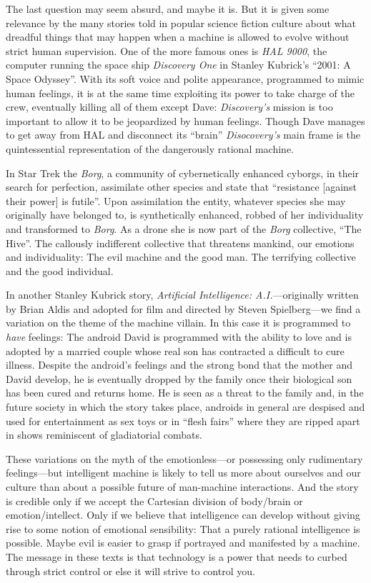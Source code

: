 The last question may seem absurd, and maybe it is. But it is given
some relevance by the many stories told in popular science fiction
culture about what dreadful things that may happen when a machine is
allowed to evolve without strict human supervision. One of the more
famous ones is \emph{HAL 9000}, the computer running the space ship
\emph{Discovery One} in Stanley Kubrick's ``2001: A Space
Odyssey''. With its soft voice and polite appearance, programmed to
mimic human feelings, it is at the same time exploiting its power to
take charge of the crew, eventually killing all of them except Dave:
\emph{Discovery's} mission is too important to allow it to be
jeopardized by human feelings. Though Dave manages to get away from
HAL and disconnect its ``brain'' \emph{Disocovery's} main frame is the
quintessential representation of the dangerously rational machine.



In Star Trek the \emph{Borg}, a community of cybernetically enhanced
cyborgs, in their search for perfection, assimilate
other species and state that ``resistance [against their power] is futile''. Upon
assimilation the entity, whatever species she may originally have
belonged to, is synthetically enhanced, robbed of her individuality
and transformed to \emph{Borg}. As a drone she is now part of the \emph{Borg}
collective, ``The Hive''. The callously indifferent collective that
threatens mankind, our emotions and individuality: The evil machine
and the good man. The terrifying collective and the good individual.

In another Stanley Kubrick story, \emph{Artificial Intelligence:
  A.I.}---originally written by Brian Aldis and adopted for film and
directed by Steven Spielberg---we find a variation on the
theme of the machine villain. In this case it is programmed to \emph{have} feelings: The
android David is programmed with the ability to love and is adopted by
a married couple whose real son has contracted a difficult to cure
illness. Despite the android's feelings and the strong bond that the
mother and David develop, he is eventually dropped by the family once
their biological son has been cured and returns home. He is seen as a
threat to the family and, in the future society in which the story takes place, androids
in general are despised and used for entertainment as sex toys or in
``flesh fairs'' where they are ripped apart in shows reminiscent of
gladiatorial combats.

These variations on the myth of the emotionless---or possessing only
rudimentary feelings---but intelligent machine is likely to tell us
more about ourselves and our culture than about a possible future of
man-machine interactions. And the story is credible only if we accept
the Cartesian division of body/brain or emotion/intellect. Only if we
believe that intelligence can develop without giving rise to some
notion of emotional sensibility: That a purely rational intelligence
is possible. Maybe evil is easier to grasp if portrayed and manifested
by a machine. The message in these texts is that technology is a power
that needs to curbed through strict control or else it will strive to
control you.

